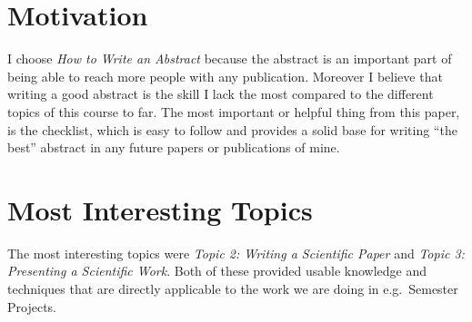 \section{Motivation}
I choose \textit{How to Write an Abstract} because the abstract is an important part of being able to reach more people with any publication.
Moreover I believe that writing a good abstract is the skill I lack the most compared to the different topics of this course to far.
The most important or helpful thing from this paper, is the checklist, which is easy to follow and provides a solid base for writing \enquote{the best} abstract in any future papers or publications of mine.

\section{Most Interesting Topics}
The most interesting topics were \textit{Topic 2: Writing a Scientific Paper} and \textit{Topic 3: Presenting a Scientific Work}.
Both of these provided usable knowledge and techniques that are directly applicable to the work we are doing in e.g.\ Semester Projects.
